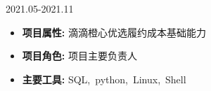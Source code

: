 \documentclass{resume}
\begin{document}
\medskip









                      {2021.05-2021.11}

\begin{itemize}  [parsep=0.5ex]

  \item   \textbf{  项目属性:  }   { 滴滴橙心优选履约成本基础能力 } 
  \item   \textbf{  项目角色:  }   {  项目主要负责人 } 
  \item   \textbf{  主要工具:  }   {  SQL,\ python,\ Linux,\ Shell }

\end{itemize}
\end{document}
